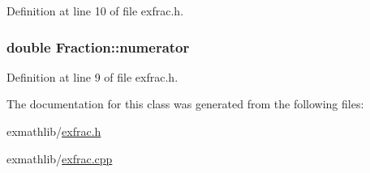 Definition at line 10 of file exfrac.\+h.

\subsubsection[{\texorpdfstring{numerator}{numerator}}]{\setlength{\rightskip}{0pt plus 5cm}double Fraction\+::numerator}\hypertarget{class_fraction_ac36191e7e0a1f931d0b5692712c58eda}{}\label{class_fraction_ac36191e7e0a1f931d0b5692712c58eda}


Definition at line 9 of file exfrac.\+h.



The documentation for this class was generated from the following files\+:\begin{DoxyCompactItemize}
\item 
exmathlib/\hyperlink{exfrac_8h}{exfrac.\+h}\item 
exmathlib/\hyperlink{exfrac_8cpp}{exfrac.\+cpp}\end{DoxyCompactItemize}

